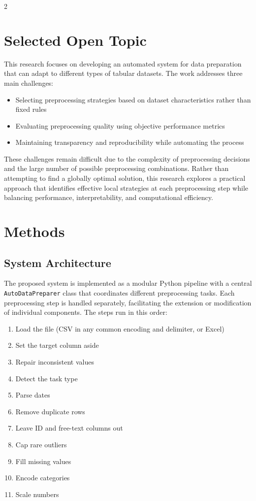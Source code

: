 \documentclass[11pt,a4paper]{article}
\begin{document}
\begin{multicols}{2}
\section{Selected Open Topic}

This research focuses on developing an automated system for data preparation that can adapt to different types of tabular datasets. The work addresses three main challenges:

\begin{itemize}
    \item Selecting preprocessing strategies based on dataset characteristics rather than fixed rules
    \item Evaluating preprocessing quality using objective performance metrics
    \item Maintaining transparency and reproducibility while automating the process
\end{itemize}

These challenges remain difficult due to the complexity of preprocessing decisions and the large number of possible preprocessing combinations. Rather than attempting to find a globally optimal solution, this research explores a practical approach that identifies effective local strategies at each preprocessing step while balancing performance, interpretability, and computational efficiency.

\section{Methods}

\subsection{System Architecture}

The proposed system is implemented as a modular Python pipeline with a central \texttt{AutoDataPreparer} class that coordinates different preprocessing tasks. Each preprocessing step is handled separately, facilitating the extension or modification of individual components. The steps run in this order:

\begin{enumerate}[noitemsep, leftmargin=*]
    \item Load the file (CSV in any common encoding and delimiter, or Excel)
    \item Set the target column aside
    \item Repair inconsistent values
    \item Detect the task type
    \item Parse dates
    \item Remove duplicate rows
    \item Leave ID and free-text columns out
    \item Cap rare outliers
    \item Fill missing values
    \item Encode categories
    \item Scale numbers
\end{enumerate}


\end{multicols}
\end{document}
